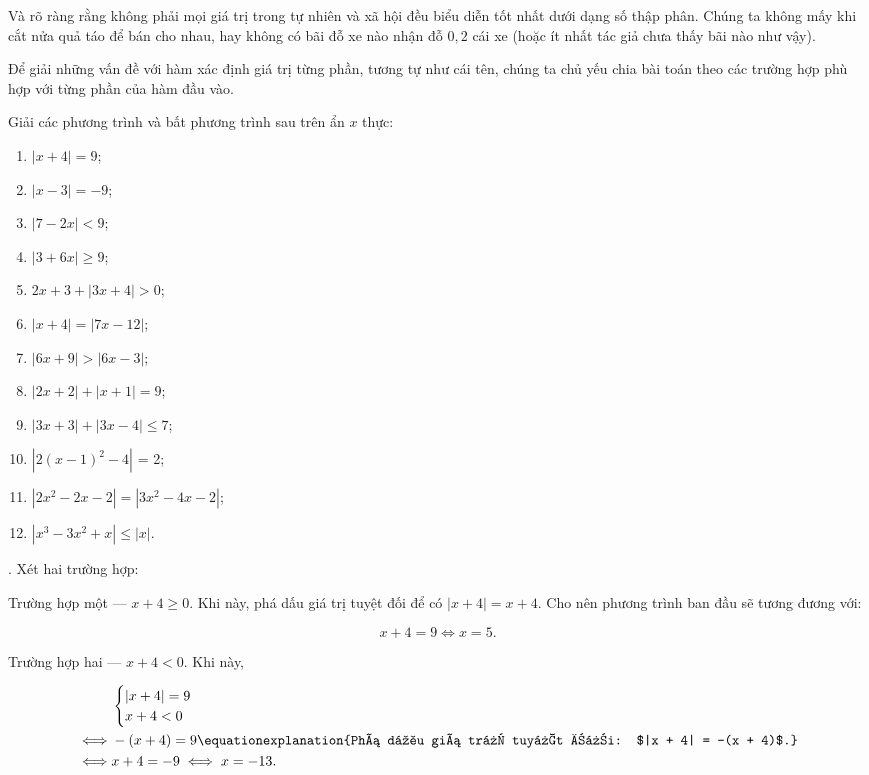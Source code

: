 Và rõ ràng rằng không phải mọi giá trị trong tự nhiên và xã hội đều biểu diễn tốt nhất dưới dạng số thập phân. Chúng ta không mấy khi cắt nửa quả táo để bán cho nhau, hay không có bãi đỗ xe nào nhận đỗ $0{,}2$ cái xe (hoặc ít nhất tác giả chưa thấy bãi nào như vậy).

Để giải những vấn đề với hàm xác định giá trị từng phần, tương tự như cái tên, chúng ta chủ yếu chia bài toán theo các trường hợp phù hợp với từng phần của hàm đầu vào.

\exercise Giải các phương trình và bất phương trình sau trên ẩn $x$ thực:

\begin{multicols}{2}
   \begin{enumerate}
      \item $|x + 4| = 9$;
      \item $|x - 3| = -9$;
      \item $|7 - 2x| < 9$;
      \item $|3 + 6x| \geq 9$;
      \item $2x + 3 + |3x + 4| > 0$;
      \item $|x + 4| = |7x - 12|$;
      \item $|6x + 9| > |6x - 3|$;
      \item $\left|2x + 2\right| + |x + 1| = 9$;
      \item $|3x + 3| + |3x - 4| \leq 7$;
      \item $\left|2(x - 1)^2 - 4\right|$ = 2;
      \item $\left|2x^2 - 2x - 2\right| = \left|3x^2 - 4x - 2\right|$;
      \item $\left|x^3 - 3x^2 + x\right| \leq |x|$.
   \end{enumerate}
\end{multicols}

\solution

\setcounter{subexercise}{1}
. Xét hai trường hợp:

\textcolor{colorEmphasisCyan}{Trường hợp một --- $x + 4 \geq 0$}. Khi này, phá dấu giá trị tuyệt đối để có $|x + 4| = x + 4$. Cho nên phương trình ban đầu sẽ tương đương với:

\begin{equation*}
   x + 4 = 9 \iff x = 5.
\end{equation*}

\textcolor{colorEmphasis}{Trường hợp hai --- $x + 4 < 0$}. Khi này,

\begin{align*}
   &\begin{cases}
      |x + 4| = 9 \\
      x + 4 < 0
   \end{cases} \\
   \iff &-(x + 4) = 9 \equationexplanation{Phá dấu giá trị tuyệt đối: $|x + 4| = -(x + 4)$.}\\
   \iff &x + 4 = -9 \iff x = -13.
\end{align*}

